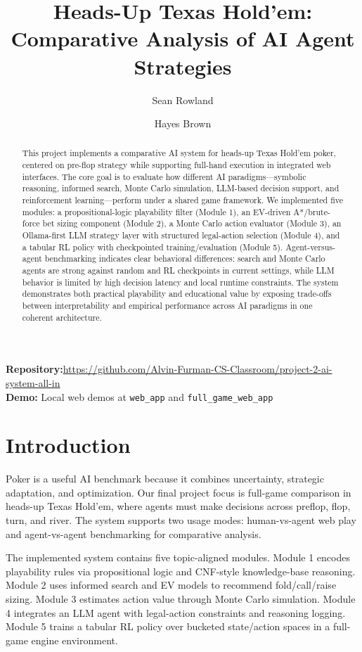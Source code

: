 \documentclass[11pt]{article}
\title{Heads-Up Texas Hold'em: Comparative Analysis of AI Agent Strategies}
\author{Sean Rowland \and Hayes Brown}
\date{}
\begin{document}
\maketitle

\noindent\textbf{Repository:}\url{https://github.com/Alvin-Furman-CS-Classroom/project-2-ai-system-all-in} \\
\textbf{Demo:} Local web demos at \texttt{web\_app} and \texttt{full\_game\_web\_app}

\begin{abstract}
This project implements a comparative AI system for heads-up Texas Hold'em poker, centered on pre-flop strategy while supporting full-hand execution in integrated web interfaces. The core goal is to evaluate how different AI paradigms---symbolic reasoning, informed search, Monte Carlo simulation, LLM-based decision support, and reinforcement learning---perform under a shared game framework. We implemented five modules: a propositional-logic playability filter (Module 1), an EV-driven A*/brute-force bet sizing component (Module 2), a Monte Carlo action evaluator (Module 3), an Ollama-first LLM strategy layer with structured legal-action selection (Module 4), and a tabular RL policy with checkpointed training/evaluation (Module 5). Agent-versus-agent benchmarking indicates clear behavioral differences: search and Monte Carlo agents are strong against random and RL checkpoints in current settings, while LLM behavior is limited by high decision latency and local runtime constraints. The system demonstrates both practical playability and educational value by exposing trade-offs between interpretability and empirical performance across AI paradigms in one coherent architecture.
\end{abstract}

\section{Introduction}
Poker is a useful AI benchmark because it combines uncertainty, strategic adaptation, and optimization. Our final project focus is full-game comparison in heads-up Texas Hold'em, where agents must make decisions across preflop, flop, turn, and river. The system supports two usage modes: human-vs-agent web play and agent-vs-agent benchmarking for comparative analysis.

The implemented system contains five topic-aligned modules. Module 1 encodes playability rules via propositional logic and CNF-style knowledge-base reasoning. Module 2 uses informed search and EV models to recommend fold/call/raise sizing. Module 3 estimates action value through Monte Carlo simulation. Module 4 integrates an LLM agent with legal-action constraints and reasoning logging. Module 5 trains a tabular RL policy over bucketed state/action spaces in a full-game engine environment.
\end{document}
